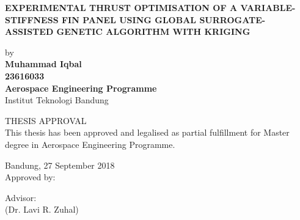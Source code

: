 \begin{center}
  {\normalsize \textbf{EXPERIMENTAL THRUST OPTIMISATION OF A VARIABLE-STIFFNESS FIN PANEL USING GLOBAL SURROGATE-ASSISTED GENETIC ALGORITHM WITH KRIGING}}\\

	\par
	\vspace{0.8cm}
	{by
	\\
	\large \textbf{Muhammad Iqbal}\\
	\large \textbf{23616033}\\
	\large \textbf{Aerospace Engineering Programme}\\
	
	Institut Teknologi Bandung

	}

THESIS APPROVAL\\
This thesis has been approved and legalised as partial fulfillment for Master degree in Aerospace Engineering Programme.

Bandung, 27 September 2018\\[0.2cm]
Approved by:

Advisor: \\[2 cm]

(Dr. Lavi R. Zuhal) 
\end{center}
